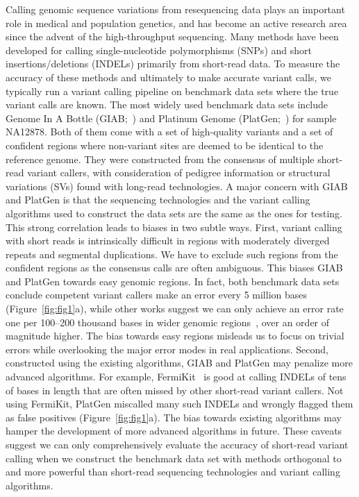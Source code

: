\documentclass{bioinfo}
\begin{document}
Calling genomic sequence variations from resequencing data plays an important
role in medical and population genetics, and has become an active research area
since the advent of the high-throughput sequencing. Many methods have been
developed for calling single-nucleotide polymorphisms (SNPs) and short
insertions/deletions (INDELs) primarily from short-read data. To measure the
accuracy of these methods and ultimately to make accurate variant calls, we
typically run a variant calling pipeline on benchmark data sets where the true
variant calls are known. The most widely used benchmark data sets include
Genome In A Bottle (GIAB;~\citealp{Zook:2014ab}) and Platinum Genome
(PlatGen;~\citealp{Eberle055541}) for sample NA12878. Both of them come with a set of high-quality
variants and a set of confident regions where non-variant sites are deemed to
be identical to the reference genome. They were constructed from the consensus
of multiple short-read variant callers, with consideration of pedigree
information or structural variations (SVs) found with long-read technologies. A major
concern with GIAB and PlatGen is that the sequencing technologies and the
variant calling algorithms used to construct the data sets are the same as the
ones for testing. This strong correlation leads to biases in two subtle ways.
First, variant calling with short reads is intrinsically difficult in regions
with moderately diverged repeats and segmental duplications.  We have to exclude
such regions from the confident regions as the consensus calls are often
ambiguous. This biases GIAB and PlatGen towards easy genomic regions. In fact,
both benchmark data sets conclude competent variant callers make an error every
5 million bases (Figure~\ref{fig:fig1}a), while other works suggest we can only
achieve an error rate one per 100--200 thousand bases in wider genomic
regions~\citep{Nickles:2012aa,Li:2014ac}, over an order of magnitude higher.
The bias towards easy regions misleads us to focus on trivial errors while
overlooking the major error modes in real applications. Second, constructed
using the existing algorithms, GIAB and PlatGen may penalize more advanced
algorithms. For example, FermiKit~\citep{Li:2015eu} is good at calling INDELs
of tens of bases in length that are often missed by other short-read variant
callers. Not using FermiKit, PlatGen miscalled many such INDELs and wrongly
flagged them as false positives (Figure~\ref{fig:fig1}a). The bias towards existing algorithms may hamper the
development of more advanced algorithms in future. These caveats suggest
we can only comprehensively evaluate the accuracy of short-read variant
calling when we construct the benchmark data set with methods orthogonal to and
more powerful than short-read sequencing technologies and variant calling
algorithms.
\end{document}

